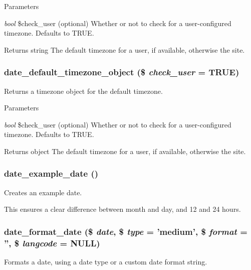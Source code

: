 \begin{DoxyParams}{Parameters}
\item[{\em bool}]\$check\_\-user (optional) Whether or not to check for a user-\/configured timezone. Defaults to TRUE.\end{DoxyParams}
\begin{DoxyReturn}{Returns}
string The default timezone for a user, if available, otherwise the site. 
\end{DoxyReturn}
\hypertarget{date__api_8module_ab642766b1f0a98ed0c91e765e8e2085b}{
\subsubsection[{date\_\-default\_\-timezone\_\-object}]{\setlength{\rightskip}{0pt plus 5cm}date\_\-default\_\-timezone\_\-object (\$ {\em check\_\-user} = {\ttfamily TRUE})}}
\label{date__api_8module_ab642766b1f0a98ed0c91e765e8e2085b}
Returns a timezone object for the default timezone.


\begin{DoxyParams}{Parameters}
\item[{\em bool}]\$check\_\-user (optional) Whether or not to check for a user-\/configured timezone. Defaults to TRUE.\end{DoxyParams}
\begin{DoxyReturn}{Returns}
object The default timezone for a user, if available, otherwise the site. 
\end{DoxyReturn}
\hypertarget{date__api_8module_a01fa4c61620fadb6556eebfe51839314}{
\subsubsection[{date\_\-example\_\-date}]{\setlength{\rightskip}{0pt plus 5cm}date\_\-example\_\-date ()}}
\label{date__api_8module_a01fa4c61620fadb6556eebfe51839314}
Creates an example date.

This ensures a clear difference between month and day, and 12 and 24 hours. \hypertarget{date__api_8module_a1c866f42568c36b77ab275733dce0da4}{
\subsubsection[{date\_\-format\_\-date}]{\setlength{\rightskip}{0pt plus 5cm}date\_\-format\_\-date (\$ {\em date}, \/  \$ {\em type} = {\ttfamily 'medium'}, \/  \$ {\em format} = {\ttfamily ''}, \/  \$ {\em langcode} = {\ttfamily NULL})}}
\label{date__api_8module_a1c866f42568c36b77ab275733dce0da4}
Formats a date, using a date type or a custom date format string.

